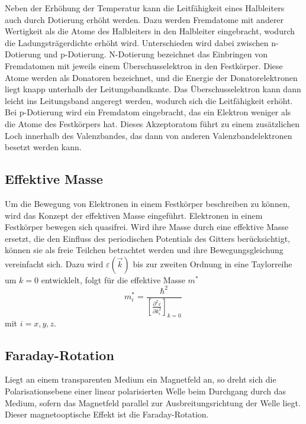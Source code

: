 Neben der Erhöhung der Temperatur kann die Leitfähigkeit eines Halbleiters auch durch Dotierung erhöht werden. Dazu 
werden Fremdatome mit anderer Wertigkeit als die Atome des Halbleiters in den Halbleiter eingebracht, wodurch die 
Ladungsträgerdichte erhöht wird. Unterschieden wird dabei zwischen n-Dotierung und p-Dotierung.
N-Dotierung bezeichnet das Einbringen von Fremdatomen mit jeweils einem Überschusselektron in den Festkörper. Diese Atome 
werden als Donatoren bezeichnet, und die Energie der Donatorelektronen liegt knapp unterhalb der Leitungsbandkante. Das Überschusselektron 
kann dann leicht ins Leitungsband angeregt werden, wodurch sich die Leitfähigkeit erhöht. 
Bei p-Dotierung wird ein Fremdatom eingebracht, das ein Elektron weniger als die Atome des Festkörpers hat. Dieses Akzeptoratom
führt zu einem zusätzlichen Loch innerhalb des Valenzbandes, das dann von anderen Valenzbandelektronen besetzt werden kann.

\subsection{Effektive Masse}
Um die Bewegung von Elektronen in einem Festkörper beschreiben zu können, wird das Konzept der effektiven Masse eingeführt.
Elektronen in einem Festkörper bewegen sich quasifrei. Wird ihre Masse durch eine effektive Masse ersetzt, die den 
Einfluss des periodischen Potentials des Gitters berücksichtigt, können sie als freie Teilchen betrachtet werden und 
ihre Bewegungsgleichung vereinfacht sich. Dazu wird $\varepsilon(\vec{k})$ bis zur zweiten Ordnung in eine
Taylorreihe um $k = 0$ entwicklelt, folgt für die effektive Masse $m^{*}$
\begin{equation*}
    m^{*}_i = \frac{\hbar^2}{\left[\frac{\partial^2 \varepsilon}{\partial k_i^2}\right]_{k = 0}} \, 
\end{equation*}
mit $i = x, y, z$.

\subsection{Faraday-Rotation}
Liegt an einem transparenten Medium ein Magnetfeld an, so dreht
sich die Polarisationsebene einer linear polarisierten Welle beim Durchgang durch das Medium, sofern das Magnetfeld
parallel zur Ausbreitungsrichtung der Welle liegt. Dieser magnetooptische Effekt ist die Faraday-Rotation.


